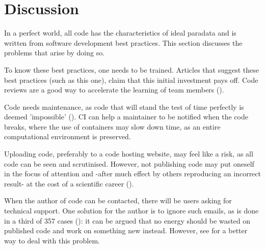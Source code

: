 \section{Discussion}

In a perfect world, all code has the characteristics of ideal paradata
and is written from software development best practices.
This section discusses the problems that arise by doing so.


To know these best practices, one needs to be trained. 
Articles that suggest these best practices (such as this one), 
claim that this initial investment pays off.
Code reviews are a good way to accelerate the 
learning of team members (\cite{vable2021code}).


Code needs maintenance,
as code that will stand the test of time perfectly 
is deemed 'impossible' (\cite{benureau2018re}).
CI can help a maintainer to be notified when the code breaks,
where the use of containers may slow down time,
as an entire computational environment is preserved.


Uploading code, preferably to a code hosting website, 
may feel like a risk, as all code can be seen and scrutinised.
However, not publishing code may put 
oneself in the focus of attention
and -after much effect by others reproducing an incorrect result-
at the cost of a scientific career (\cite{baggerly2009deriving}).


When the author of code can be contacted,
there will be users asking for technical support.
One solution for the author is to ignore such emails,
as is done in a third of 357 cases (\cite{teunis2015corresponding}):
it can be argued that no energy should be wasted on published code
and work on something new instead.
However, see \cite{barnes2010publish} for a better way to deal with this problem.

